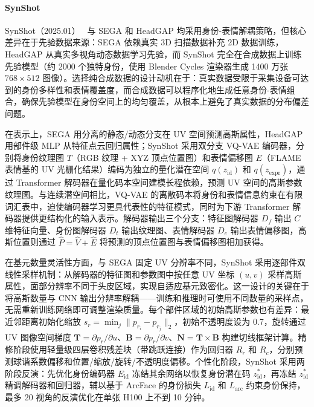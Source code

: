 \paragraph{SynShot}

SynShot（2025.01）~\cite{2501_06903} 与 SEGA 和 HeadGAP 均采用身份-表情解耦策略，但核心差异在于先验数据来源：SEGA 依赖真实 3D 扫描数据补充 2D 数据训练，HeadGAP 从真实多视角动态数据学习先验，而 SynShot 完全在合成数据上训练先验模型（约 2000 个独特身份，使用 Blender Cycles 渲染器生成 1400 万张 $768 \times 512$ 图像）。选择纯合成数据的设计动机在于：真实数据受限于采集设备可达到的身份多样性和表情覆盖度，而合成数据可以程序化地生成任意身份-表情组合，确保先验模型在身份空间上的均匀覆盖，从根本上避免了真实数据的分布偏差问题。

在表示上，SEGA 用分离的静态/动态分支在 UV 空间预测高斯属性，HeadGAP 用部件级 MLP 从特征点云回归属性；SynShot 采用双分支 VQ-VAE 编码器，分别将身份纹理图 $T$（RGB 纹理 + XYZ 顶点位置图）和表情偏移图 $E$（FLAME 表情基的 UV 光栅化结果）编码为独立的量化潜在空间 $q(z_{\text{id}})$ 和 $q(z_{\text{expr}})$，通过 Transformer 解码器在量化码本空间建模长程依赖，预测 UV 空间的高斯参数纹理图。与连续潜空间相比，VQ-VAE 的离散码本将身份和表情信息约束在有限词汇表中，迫使编码器学习更具代表性的特征模式，同时为下游 Transformer 解码器提供更结构化的输入表示。解码器输出三个分支：特征图解码器 $D_f$ 输出 $C$ 维特征向量、身份图解码器 $D_t$ 输出纹理图、表情解码器 $D_e$ 输出表情偏移图，高斯位置则通过 $\hat{P} = \hat{V} + \hat{E}$ 将预测的顶点位置图与表情偏移图相加获得。

在基元数量灵活性方面，与 SEGA 固定 UV 分辨率不同，SynShot 采用逐部件双线性采样机制：从解码器的特征图和参数图中按任意 UV 坐标 $(u, v)$ 采样高斯属性，面部分辨率不同于头皮区域，实现自适应基元致密化。这一设计的关键在于将高斯数量与 CNN 输出分辨率解耦——训练和推理时可使用不同数量的采样点，无需重新训练网络即可调整渲染质量。每个部件区域的初始高斯参数也有差异：最近邻距离初始化缩放 $s_r = \min_j \|p_{r_i} - p_{r_j}\|_2$，初始不透明度设为 0.7，旋转通过 UV 图像空间梯度 $\mathbf{T} = \partial p_r / \partial u$、$\mathbf{B} = \partial p_r / \partial v$、$\mathbf{N} = \mathbf{T} \times \mathbf{B}$ 构建切线框架计算。精修阶段使用轻量级四层卷积残差块（带跳跃连接）作为回归器 $R_r$ 和 $R_c$，分别预测球谐系数偏移和位置/缩放/旋转/不透明度偏移。个性化阶段，SynShot 采用两阶段反演：先优化身份编码器 $E_{\text{id}}$ 冻结其余网络以恢复身份潜在码 $z_{\text{id}}^*$，再冻结 $z_{\text{id}}^*$ 精调解码器和回归器，辅以基于 ArcFace 的身份损失 $L_{\text{id}}$ 和 $L_{\text{arc}}$ 约束身份保持，最多 20 视角的反演优化在单张 H100 上不到 10 分钟。


